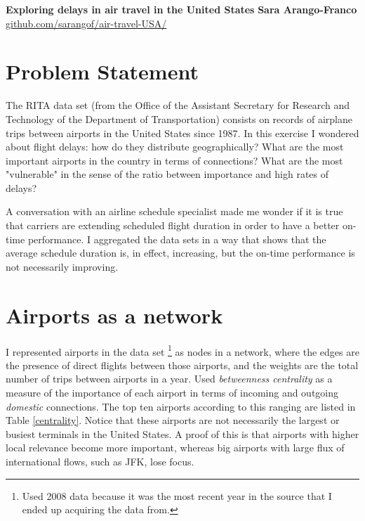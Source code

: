 \documentclass[a4paper, 11pt]{article}
\begin{document}
\noindent
\large\textbf{Exploring delays in air travel in the United States} \hfill \textbf{Sara Arango-Franco} \\
\normalsize \url{github.com/sarangof/air-travel-USA/} 

\section*{Problem Statement}
The RITA data set (from the Office of the Assistant Secretary for Research and Technology of the Department of Transportation) consists on records of airplane trips between airports in the United States since 1987. In this exercise I wondered about flight delays: how do they distribute geographically? What are the most important airports in the country in terms of connections? What are the most "vulnerable" in the sense of the ratio between importance and high rates of delays?

A conversation with an airline schedule specialist made me wonder if it is true that carriers are extending scheduled flight duration in order to have a better on-time performance. I aggregated the data sets in a way that shows that the average schedule duration is, in effect, increasing, but the on-time performance is not necessarily improving.

\section*{Airports as a network}


I represented airports in the data set \footnote{Used 2008 data because it was the most recent year in the source that I ended up acquiring the data from.} as nodes in a network, where the edges are the presence of direct flights between those airports, and the weights are the total number of trips between airports in a year. Used \textit{betweenness centrality} as a measure of the importance of each airport in terms of incoming and outgoing \textit{domestic} connections. The top ten airports according to this ranging are listed in Table \ref{centrality}. Notice that these airports are not necessarily the largest or busiest terminals in the United States. A proof of this is that airports with higher local relevance become more important, whereas big airports with large flux of international flows, such as JFK, lose focus.
\end{document}
